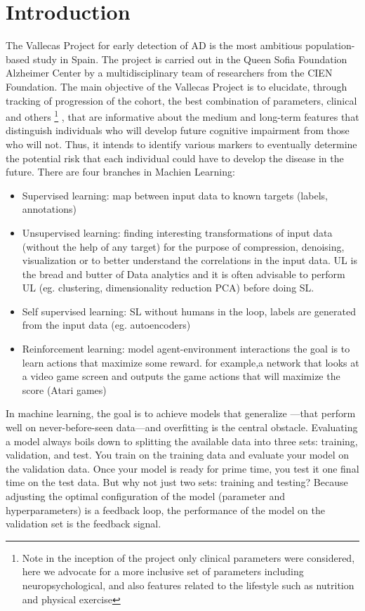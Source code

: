 \documentclass[12pt]{report}
\begin{document}
\section{Introduction}
The Vallecas Project for early detection of AD is the most ambitious population-based study in Spain. The project is carried out in the Queen Sofia Foundation Alzheimer Center by a multidisciplinary team of researchers from the CIEN Foundation. The main objective of the Vallecas Project is to elucidate, through tracking of progression of the cohort, the best combination of  parameters, clinical and others \footnote{Note in the inception of the project only clinical parameters were considered, here we advocate for a more inclusive set of parameters including neuropsychological, and also features related to the lifestyle such as nutrition and physical exercise} , that are informative about the medium and long-term features that distinguish individuals who will develop future cognitive impairment from those who will not. Thus, it intends to identify various markers to eventually determine the potential risk that each individual could have to develop the disease in the future.
There are four branches in Machien Learning:
\begin{itemize}
\item Supervised learning: map between input data to known targets (labels, annotations) 
\item Unsupervised learning: finding interesting transformations of input data (without the help of any target) for the purpose of compression, denoising, visualization or to better understand the correlations in the input data. UL is the bread and butter of Data analytics and it is often advisable to perform UL (eg. clustering, dimensionality reduction PCA) before doing SL. 
\item Self supervised learning: SL without humans in the loop, labels are generated from the input data (eg. autoencoders)
\item Reinforcement learning: model agent-environment interactions the goal is to learn actions that maximize some reward. for example,a network that looks at a video game screen and outputs the game actions that will maximize the score (Atari games)
\end{itemize}
In machine learning, the goal is to achieve models that generalize —that perform well on never-before-seen data—and overfitting is the central obstacle. Evaluating a model always boils down to splitting the available data into three sets: training, validation, and test. You train on the training data and evaluate your model on the validation data. Once your model is ready for prime time, you test it one final time on the test data. 
But why not just two sets: training and testing? Because adjusting the optimal configuration of the model (parameter and hyperparameters) is a feedback loop, the performance of the model on the validation set is the feedback signal.
\end{document}

